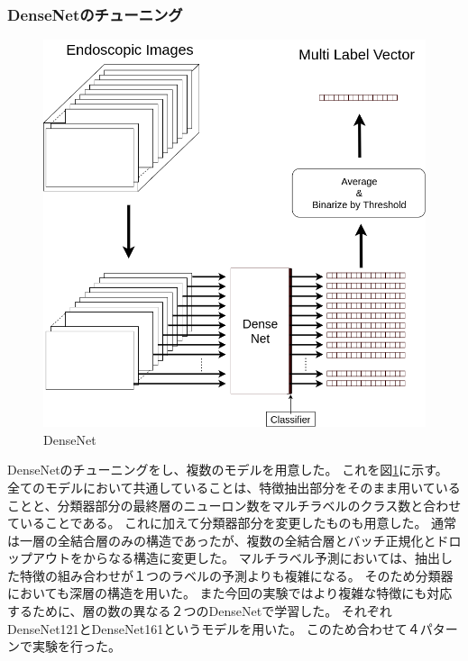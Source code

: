 \subsubsection{DenseNetのチューニング}

\begin{figure}[tb]
    \begin{center}
        \includegraphics[width=150mm]{./fig/ieice2.png}
        \caption{DenseNet}
        \label{fig:densenet}
    \end{center}
\end{figure}

DenseNetのチューニングをし、複数のモデルを用意した。
これを図\ref{fig:densenet}に示す。
全てのモデルにおいて共通していることは、特徴抽出部分をそのまま用いていることと、分類器部分の最終層のニューロン数をマルチラベルのクラス数と合わせていることである。
これに加えて分類器部分を変更したものも用意した。
通常は一層の全結合層のみの構造であったが、複数の全結合層とバッチ正規化とドロップアウトをからなる構造に変更した。
マルチラベル予測においては、抽出した特徴の組み合わせが１つのラベルの予測よりも複雑になる。
そのため分類器においても深層の構造を用いた。
また今回の実験ではより複雑な特徴にも対応するために、層の数の異なる２つのDenseNetで学習した。
それぞれDenseNet121\cite{DenseNet}とDenseNet161\cite{DenseNet}というモデルを用いた。
このため合わせて４パターンで実験を行った。
